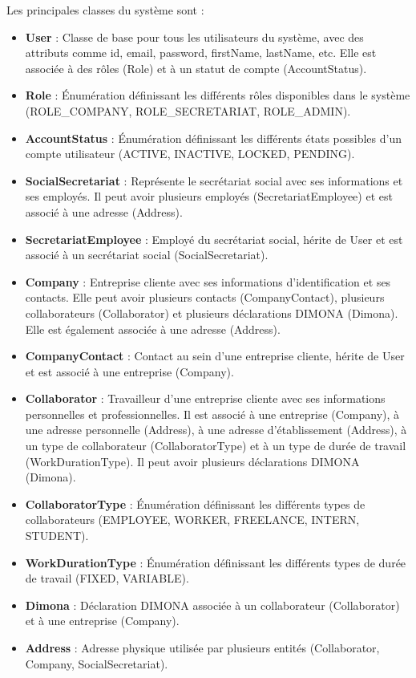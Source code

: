 Les principales classes du système sont :

\begin{itemize}
  \item \textbf{User} : Classe de base pour tous les utilisateurs du système, avec des attributs comme id, email, password, firstName, lastName, etc. Elle est associée à des rôles (Role) et à un statut de compte (AccountStatus).

  \item \textbf{Role} : Énumération définissant les différents rôles disponibles dans le système (ROLE\_COMPANY, ROLE\_SECRETARIAT, ROLE\_ADMIN).

  \item \textbf{AccountStatus} : Énumération définissant les différents états possibles d'un compte utilisateur (ACTIVE, INACTIVE, LOCKED, PENDING).

  \item \textbf{SocialSecretariat} : Représente le secrétariat social avec ses informations et ses employés. Il peut avoir plusieurs employés (SecretariatEmployee) et est associé à une adresse (Address).

  \item \textbf{SecretariatEmployee} : Employé du secrétariat social, hérite de User et est associé à un secrétariat social (SocialSecretariat).

  \item \textbf{Company} : Entreprise cliente avec ses informations d'identification et ses contacts. Elle peut avoir plusieurs contacts (CompanyContact), plusieurs collaborateurs (Collaborator) et plusieurs déclarations DIMONA (Dimona). Elle est également associée à une adresse (Address).

  \item \textbf{CompanyContact} : Contact au sein d'une entreprise cliente, hérite de User et est associé à une entreprise (Company).

  \item \textbf{Collaborator} : Travailleur d'une entreprise cliente avec ses informations personnelles et professionnelles. Il est associé à une entreprise (Company), à une adresse personnelle (Address), à une adresse d'établissement (Address), à un type de collaborateur (CollaboratorType) et à un type de durée de travail (WorkDurationType). Il peut avoir plusieurs déclarations DIMONA (Dimona).

  \item \textbf{CollaboratorType} : Énumération définissant les différents types de collaborateurs (EMPLOYEE, WORKER, FREELANCE, INTERN, STUDENT).

  \item \textbf{WorkDurationType} : Énumération définissant les différents types de durée de travail (FIXED, VARIABLE).

  \item \textbf{Dimona} : Déclaration DIMONA associée à un collaborateur (Collaborator) et à une entreprise (Company).

  \item \textbf{Address} : Adresse physique utilisée par plusieurs entités (Collaborator, Company, SocialSecretariat).
\end{itemize}

